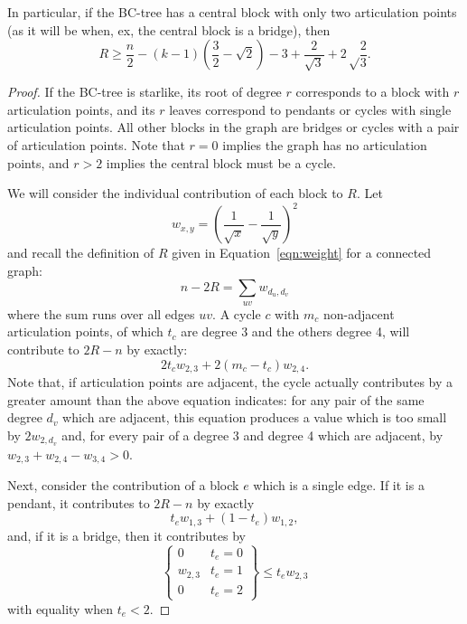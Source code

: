 \documentclass{amsart}
\theoremstyle{definition}
\begin{document}
In particular, if the BC-tree has a central block with only two articulation points (as it will be when, ex, the central block is a bridge), then
\[R \geq \frac{n}{2} - (k-1)\left(\frac{3}{2} - \sqrt 2 \right) - 3 + \frac{2}{\sqrt 3} + 2\sqrt\frac{2}{3}.\]%

\begin{proof}%
If the BC-tree is starlike, its root of degree $r$ corresponds to a block with $r$ articulation points, and its $r$ leaves correspond to pendants or cycles with single articulation points. All other blocks in the graph are bridges or cycles with a pair of articulation points. Note that $r=0$ implies the graph has no articulation points, and $r > 2$ implies the central block must be a cycle.

We will consider the individual contribution of each block to $R$. Let 
\[w_{x,y} = \left(\frac{1}{\sqrt x}-\frac{1}{\sqrt y}\right)^2\]
and recall the definition of $R$ given in Equation~\eqref{eqn:weight} for a connected graph:
\[n-2R = \sum_{uv}w_{d_u,d_v}\]
where the sum runs over all edges $uv$. A cycle $c$ with $m_c$ non-adjacent articulation points, of which $t_c$ are degree 3 and the others degree 4, will contribute to $2R-n$ by exactly:
\[2t_cw_{2,3}+2(m_c-t_c)w_{2,4}.\]
Note that, if articulation points are adjacent, the cycle actually contributes by a greater amount than the above equation indicates: for any pair of the same degree $d_v$ which are adjacent, this equation produces a value which is too small by $2w_{2,d_v}$ and, for every pair of a degree 3 and degree 4 which are adjacent, by $w_{2,3}+w_{2,4}-w_{3,4}>0$. 

Next, consider the contribution of a block $e$ which is a single edge. If it is a pendant, it contributes to $2R-n$ by exactly
\[t_ew_{1,3}+(1-t_e)w_{1,2},\]
and, if it is a bridge, then it contributes by
\[\left.\begin{cases} 0 & t_e = 0\\ w_{2,3} & t_e = 1\\ 0 & t_e = 2\end{cases}\right\} \leq t_ew_{2,3}\]
with equality when $t_e < 2$.


\end{proof}
\end{document}
